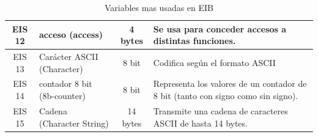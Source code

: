 \begin{table}[htbp]
\begin{tabular}{cp{4cm}cp{5.5cm}}
EIS 12 & acceso (access) & 4 bytes & Se usa para conceder accesos a distintas funciones. \\ \midrule
EIS 13 & Carácter ASCII (Character) & 8 bit & Codifica según el formato ASCII \\ \midrule
EIS 14 & contador 8 bit (8b-counter) & 8 bit & Representa los valores de un contador de 8 bit  (tanto con signo como sin signo). \\ \midrule
EIS 15 & Cadena (Character String) & 14 bytes & Transmite una cadena de caracteres ASCII  de hasta 14 bytes. \\ \bottomrule
\end{tabular}
\caption{Variables mas usadas en EIB}
\label{tab:variables_eib}
\end{table}



